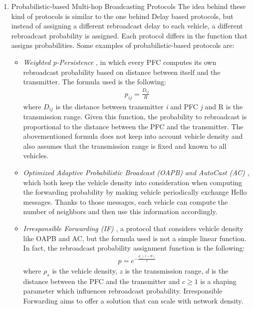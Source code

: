 \begin{enumerate}
			\item Probabilistic-based Multi-hop Broadcasting Protocols
			The idea behind these kind of protocols is similar to the one behind Delay based protocols, but instead of assigning a different rebroadcast delay to each vehicle, a different rebroadcast probability is assigned. Each protocol differs in the function that assigns probabilities. Some examples of probabilistic-based protocols are:
			\begin{itemize}
				\renewcommand\labelitemi{--}
				\item \textit{Weighted p-Persistence} \cite{4407231}, in which every PFC computes its own rebroadcast probability based on distance between itself and the transmitter. The formula used is the following:
				\begin{gather}
					p_{ij} = \frac{D_{ij}}{R}
					\label{eq:weighted-p-persistence}
				\end{gather}
				where $D_{ij}$ is the distance between transmitter \textit{i} and PFC \textit{j} and R is the transmission range. Given this function, the probability to rebroadcast is proportional to the distance between the PFC and the transmitter. The abovementioned formula does not keep into account vehicle density and also assumes that the transmission range is fixed and known to all vehicles.
				
				\item \textit{Optimized Adaptive Probabilistic Broadcast (OAPB)\cite{1543865} and AutoCast (AC) \cite{4350058}}, which both keep the vehicle density into consideration when computing the forwarding probability by making vehicle periodically exchange Hello messages. Thanks to those messages, each vehicle can compute the number of neighbors and then use this information accordingly.
				
				\item \textit{Irresponsible Forwarding (IF)} \cite{4740277}\cite{5426212}, a protocol that considers vehicle density like OAPB and AC, but the formula used is not a simple linear function. In fact, the rebroadcast probability assignment function is the following:
				\begin{gather}
					p = e^{-\frac{\rho_s(z-d)}{c}}
				\end{gather}
				where $\rho_s$ is the vehicle density, $z$ is the transmission range, $d$ is the distance between the PFC and the transmitter and $c\geq1$ is a shaping parameter which influences rebroadcast probability. Irresponsible Forwarding aims to offer a solution that can scale with network density.
			\end{itemize}
			

\end{enumerate}
